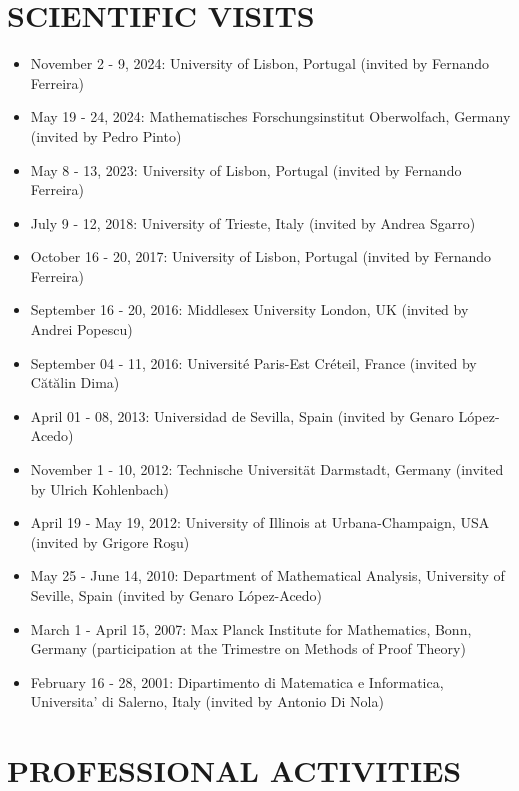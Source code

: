 \documentclass[12pt]{article}
\begin{document}
\section*{SCIENTIFIC VISITS}

\begin{itemize}
\item November 2 - 9, 2024: University of Lisbon, Portugal (invited by Fernando Ferreira)
\item May 19 - 24, 2024:  Mathematisches Forschungsinstitut Oberwolfach,  Germany (invited by Pedro Pinto)
\item May 8 - 13, 2023: University of Lisbon, Portugal (invited by Fernando Ferreira)
\item July 9 - 12, 2018: University of Trieste, Italy (invited by Andrea Sgarro)
\item October 16 - 20, 2017: University of Lisbon, Portugal (invited by Fernando Ferreira)
\item September 16 - 20, 2016: Middlesex University London,  UK (invited by Andrei Popescu)
\item September 04 - 11, 2016: Universit\' e Paris-Est Cr\'eteil, France (invited by C\u at\u alin Dima)
\item April 01 - 08, 2013: Universidad de Sevilla, Spain (invited by Genaro L\'{o}pez-Acedo)
\item November 1 - 10, 2012:
Technische Universit\"{a}t Darmstadt, Germany (invited by Ulrich Kohlenbach)
\item April 19 - May 19, 2012:
 University of Illinois at Urbana-Champaign, USA (invited by Grigore Ro\c{s}u)
\item May 25 - June 14, 2010:
Department of Mathematical Analysis, University of Seville, Spain (invited by Genaro L\'{o}pez-Acedo)
\item March 1 - April 15, 2007:
Max Planck Institute for Mathematics, Bonn, Germany (participation at the Trimestre on Methods of Proof Theory)
\item February 16 - 28, 2001:
Dipartimento di Matematica e Informatica, Universita' di Salerno, Italy (invited by Antonio Di Nola)
\end{itemize}



\section*{PROFESSIONAL ACTIVITIES}
\end{document}
